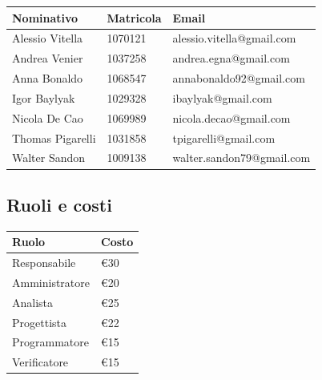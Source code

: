 \documentclass[12pt,a4paper]{article}
\begin{document}
\begin{tabular}{| l | l | l |}
    \hline
    Nominativo & Matricola & Email \\ \hline
    Alessio Vitella & 1070121 & alessio.vitella@gmail.com \\ \hline
    Andrea Venier & 1037258 & andrea.egna@gmail.com \\ \hline
    Anna Bonaldo & 1068547 & annabonaldo92@gmail.com \\ \hline
    Igor Baylyak & 1029328 & ibaylyak@gmail.com \\ \hline
    Nicola De Cao & 1069989 & nicola.decao@gmail.com \\ \hline
    Thomas Pigarelli & 1031858 & tpigarelli@gmail.com \\ \hline
    Walter Sandon & 1009138 & walter.sandon79@gmail.com \\ \hline
\end{tabular}

\subsection{Ruoli e costi}

\begin{tabular}{| l | l |}
    \hline
    Ruolo & Costo \\ \hline
    Responsabile & \euro{}30 \\ \hline
    Amministratore & \euro{}20 \\ \hline
    Analista & \euro{}25 \\ \hline
    Progettista & \euro{}22 \\ \hline
    Programmatore & \euro{}15 \\ \hline
    Verificatore & \euro{}15 \\ \hline
\end{tabular}
\end{document}
